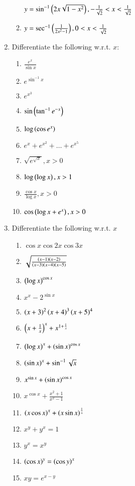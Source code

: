 \begin{enumerate}[label=\arabic*.,ref=\thesubsection.\theenumi]
\begin{enumerate}
$
y = \sin^{-1}\left(2x\sqrt{1-x^2}\right), -\frac{1}{\sqrt{2}} < x < \frac{1}{\sqrt{2}}
$
\item 
$
y = \sec^{-1}\left(\frac{1}{2x^2-1}\right), 0 < x < \frac{1}{\sqrt{2}}
$
\end{enumerate}
\item Differentiate the following w.r.t. $x$:
\begin{enumerate}
\item 
$
\frac{e^x}{\sin x}
$
\item 
$
e^{\sin ^{-1} x}
$
\item 
$
e^{x^3}
$
\item 
$
\sin \left(\tan ^{-1}e^{-x}\right)
$
\item 
$
\log\left(\cos e^x\right)
$
\item 
$
e^x + e^{x^2}+\dots+e^{x^5}
$
\item 
$
\sqrt{e^{\sqrt{x}}}, x > 0
$
\item 
$
\log\left(\log x\right), x > 1
$
\item 
$
\frac{\cos x}{\log x}, x > 0
$
\item 
$
\cos \left(\log x + e^x\right), x > 0
$
\end{enumerate}
\item Differentiate the following w.r.t. $x$
\begin{enumerate}
\item 
$
\cos x \cos 2x \cos 3x
$
\item 
$
\sqrt{\frac{\left(x-1\right)\left(x-2\right)}{\left(x-3\right)\left(x-4\right)\left(x-5\right)}}
$
\item 
$
\left(\log x\right)^{\cos x}
$
\item 
$
x^x - 2^{\sin x}
$
\item 
$
\left(x+3\right)^2\left(x+4\right)^3\left(x+5\right)^4
$
\item 
$
\left(x + \frac{1}{x}\right)^x+x^{1+\frac{1}{x}}
$
\item 
$
\left(\log x\right)^x + \left(\sin x\right)^{\cos x}
$
\item 
$
\left(\sin x\right)^x +\sin^{-1}\sqrt{x}
$
\item 
$
x^{\sin x} + \left(\sin x\right)^{\cos x}
$
\item 
$
x^{\cos x} + \frac{x^2+1}{x^2-1}
$
\item 
$
\left(x \cos x\right)^x + \left(x \sin x\right)^{\frac{1}{x}}
$
\item 
$
x^{y}+y^x = 1
$
\item 
$
y^x = x^y
$
\item 
$
\left(\cos x\right)^y = \left(\cos y\right)^{x}
$
\item
$
xy = e^{x-y}
$
\end{enumerate}

\end{enumerate}
